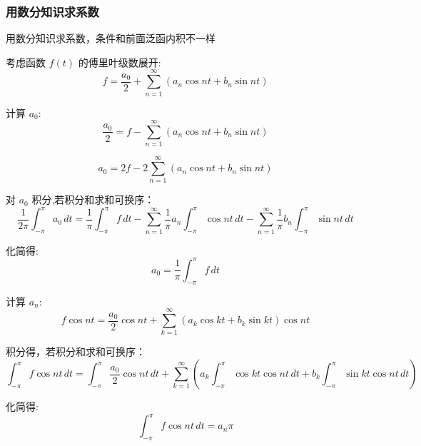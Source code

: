 \documentclass[a4paper, 12pt, oneside]{article} %
\numberwithin{subsection}{section}
\numberwithin{subsubsection}{subsection}
\theoremstyle{plain}
\theoremstyle{definition}
\theoremstyle{remark}
\begin{document}
		\subsubsection{用数分知识求系数}
		用数分知识求系数，条件和前面泛函内积不一样
		
		考虑函数 \( f(t) \) 的傅里叶级数展开:
		\begin{equation}
			f = \frac{a_0}{2} + \sum_{n=1}^{\infty} \left( a_n \cos nt + b_n \sin nt \right)
		\end{equation}
		
		计算 \( a_0 \):
		\begin{equation}
			\frac{a_0}{2} = f - \sum_{n=1}^{\infty} \left( a_n \cos nt + b_n \sin nt \right)
		\end{equation}
		
		\begin{equation}
			a_0 = 2f - 2 \sum_{n=1}^{\infty} \left( a_n \cos nt + b_n \sin nt \right)
		\end{equation}
		
		对 \( a_0 \) 积分,若积分和求和可换序：
		\begin{equation}
			\frac{1}{2\pi} \int_{-\pi}^{\pi} a_0 \, dt = \frac{1}{\pi} \int_{-\pi}^{\pi} f \, dt - \sum_{n=1}^{\infty} \frac{1}{\pi} a_n \int_{-\pi}^{\pi} \cos nt \, dt - \sum_{n=1}^{\infty} \frac{1}{\pi} b_n \int_{-\pi}^{\pi} \sin nt \, dt
		\end{equation}
		
		化简得:
		\begin{equation}
			a_0 = \frac{1}{\pi} \int_{-\pi}^{\pi} f \, dt
		\end{equation}
		
		计算 \( a_n \):
		\begin{equation}
			f \cos nt = \frac{a_0}{2} \cos nt + \sum_{k=1}^{\infty} \left( a_k \cos kt + b_k \sin kt \right) \cos nt
		\end{equation}
		
		积分得，若积分和求和可换序：
		\begin{equation}
			\int_{-\pi}^{\pi} f \cos nt \, dt = \int_{-\pi}^{\pi} \frac{a_0}{2} \cos nt \, dt + \sum_{k=1}^{\infty} \left( a_k \int_{-\pi}^{\pi} \cos kt \cos nt \, dt + b_k \int_{-\pi}^{\pi} \sin kt \cos nt \, dt \right)
		\end{equation}
		
		化简得:
		\begin{equation}
			\int_{-\pi}^{\pi} f \cos nt \, dt = a_n \pi
		\end{equation}
		
\end{document}

